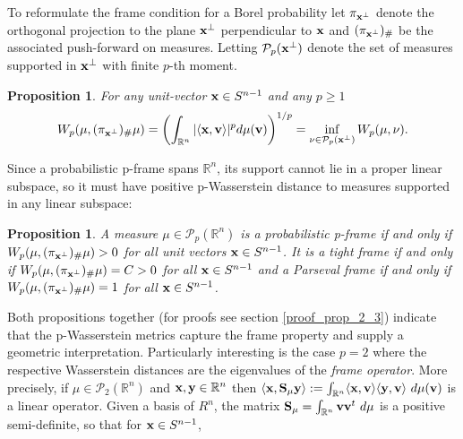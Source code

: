 \documentclass{amsart}
\numberwithin{equation}{section}
\newcommand\cP{{\mathcal P}}
\newcommand\R{{\mathbb R}}
\theoremstyle{plain}
\newtheorem{proposition}[subsection]{Proposition}
\theoremstyle{definition}
\begin{document}
To reformulate the frame condition for a Borel probability let $\pi_{{\bf x}^{\perp}}$ denote the orthogonal projection to the plane ${\bf x}^{\perp}$ perpendicular to ${\bf x}$ and $(\pi_{{\bf x}^{\perp}})_{\#}$ be the associated push-forward on measures. Letting $\cP_p({\bf x}^{\perp})$ denote the set of measures supported in ${\bf x}^{\perp}$ with finite $p$-th moment. 
\begin{proposition}\label{Was_Hyperplane_Frame}
For any unit-vector ${\bf x} \in S^{n-1}$ and any $p \geq 1$  
$$W_p(\mu, (\pi_{{\bf x}^{\perp}})_{\#}\mu)=\left(\int_{\mathbb{R}^n} |\langle{\bf x}, {\bf v} \rangle |^p d\mu({\bf v})\right)^{1/p}=\inf_{\nu \in \cP_p({\bf x}^{\perp}) } W_p(\mu, \nu).$$
\end{proposition}
Since a probabilistic p-frame spans $\R^n$, its support cannot lie in a proper linear subspace, so it must have positive p-Wasserstein distance to measures supported in any linear subspace: 
\begin{proposition}\label{Was_frame_formulation}
A measure $\mu \in \cP_p(\R^n)$ is a probabilistic p-frame if and only if $W_p(\mu,(\pi_{{\bf x}^{\perp}})_{\#}\mu)>0$ for all unit vectors ${\bf x} \in S^{n-1}$. It is a tight frame if and only if $W_p(\mu,(\pi_{{\bf x}^{\perp}})_{\#}\mu)=C>0$ for all ${\bf x} \in S^{n-1}$ and a Parseval frame 
if and only if $W_p(\mu,(\pi_{{\bf x}^{\perp}})_{\#}\mu)=1$ for all ${\bf x} \in S^{n-1}$.  
\end{proposition} 
Both propositions together (for proofs see section \ref{proof_prop_2_3}) indicate that the p-Wasserstein metrics capture the frame property and supply a geometric interpretation.  
Particularly interesting is the case $p=2$ where the respective Wasserstein distances are the eigenvalues of the {\em frame operator}. More precisely, if  
$\mu \in \cP_2(\R^n)$ and ${\bf x}, {\bf y} \in \mathbb{R}^n$  then $\langle {\bf x}, {\bf S}_{\mu} {\bf y}\rangle :=\int_{\mathbb{R}^n}  \langle{\bf x}, {\bf v}\rangle \langle{\bf y}, {\bf v}\rangle\  d\mu({\bf v})$ is a linear operator. Given a basis of $R^n$, the matrix ${\bf S}_{\mu}=\int_{\mathbb{R}^n} {\bf v} {\bf v}^t\  d\mu$ is a positive semi-definite, so that for ${\bf x} \in S^{n-1}$,   
\end{document}
